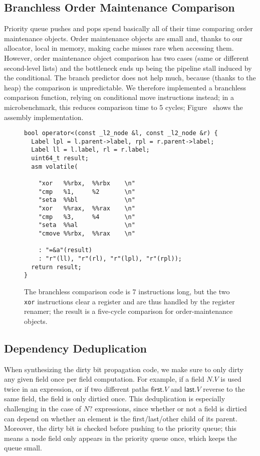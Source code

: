 \subsection{Branchless Order Maintenance Comparison}
Priority queue pushes and pops spend basically all of their time
  comparing order maintenance objects.
Order maintenance objects are small and,
  thanks to our allocator, local in memory,
  making cache misses rare when accessing them.
However, order maintenance object comparison has two cases
  (same or different second-level lists)
  and the bottleneck ends up being the pipeline stall
  induced by the conditional.
The branch predictor does not help much,
  because (thanks to the heap) the comparison is unpredictable.
We therefore implemented a branchless comparison function,
  relying on conditional move instructions instead;
  in a microbenchmark, this reduces comparison time
  to 5 cycles; Figure~\cite{fig:compare} shows the
  assembly implementation.


\begin{figure}
\begin{verbatim}
bool operator<(const _l2_node &l, const _l2_node &r) {
  Label lpl = l.parent->label, rpl = r.parent->label;
  Label ll = l.label, rl = r.label;
  uint64_t result;
  asm volatile(
  
    "xor   %%rbx,  %%rbx    \n"
    "cmp   %1,     %2       \n"
    "seta  %%bl             \n"
    "xor   %%rax,  %%rax    \n"
    "cmp   %3,     %4       \n"
    "seta  %%al             \n"
    "cmove %%rbx,  %%rax    \n"
    
    : "=&a"(result)
    : "r"(ll), "r"(rl), "r"(lpl), "r"(rpl));
  return result;
}
\end{verbatim}
\caption{
  The branchless comparison code is 7 instructions long,
    but the two \texttt{xor} instructions
    clear a register and are thus handled by the register renamer;
    the result is a five-cycle comparison
    for order-maintenance objects.
}
\label{fig:compare}
\end{figure}

\subsection{Dependency Deduplication}

When synthesizing the dirty bit propagation code,
  we make sure to only dirty any given field once per field computation.
For example, if a field $N.V$ is used twice in an expression,
  or if two different paths $\mathsf{first}.V$ and $\mathsf{last}.V$
  reverse to the same field,
  the field is only dirtied once.
This deduplication is especially challenging in the case
  of $N?$ expressions,
  since whether or not a field is dirtied can depend on whether an element
  is the first/last/other child of its parent.
Moreover, the dirty bit is checked before pushing to the priority queue;
  this means a node field only appears in the priority queue once,
  which keeps the queue small.

